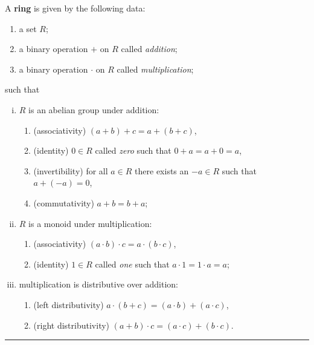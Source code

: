 \documentclass[12pt]{article}
\newcommand{\keyword}[1]{\textbf{#1}}
\newcommand{\sepline}{\rule{\textwidth}{0.4pt}}
\theoremstyle{definition}
\newcommand{\<}{\left\langle}
\renewcommand{\>}{\right\rangle}
\renewcommand{\_}[1]{{_{#1}}}
\begin{document}
A \keyword{ring} is given by the following data:
\begin{enumerate}[(1)]
    \item a set $R$;
    \item a binary operation $+$ on $R$ called \emph{addition};
    \item a binary operation $\cdot$ on $R$ called \emph{multiplication};
\end{enumerate}
such that
\begin{enumerate}[(i)]
    \item $R$ is an abelian group under addition:
    \begin{enumerate}
        \item (associativity) $(a + b) + c = a + (b + c)$,
        \item (identity) $0 \in R$ called \emph{zero} such that $0 + a = a + 0 = a$,
        \item (invertibility) for all $a \in R$ there exists an $-a \in R$ such that $a + (-a) = 0$,
        \item (commutativity) $a + b = b + a$;
    \end{enumerate}
    \item $R$ is a monoid under multiplication:
    \begin{enumerate}
        \item (associativity) $(a \cdot b) \cdot c = a \cdot (b \cdot c)$,
        \item (identity) $1 \in R$ called \emph{one} such that $a \cdot 1 = 1 \cdot a = a$;
    \end{enumerate}
    \item multiplication is distributive over addition:
    \begin{enumerate}
        \item (left distributivity) $a \cdot (b + c) = (a \cdot b) + (a \cdot c)$,
        \item (right distributivity) $(a + b) \cdot c = (a \cdot c) + (b \cdot c)$.
    \end{enumerate}
\end{enumerate}

\sepline
\end{document}
